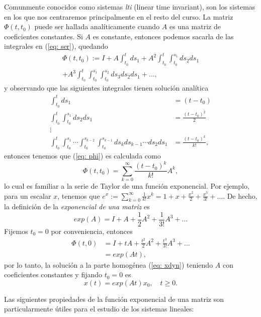 Comunmente conocidos como sistemas \emph{lti} (linear time invariant), son los sistemas en los que nos centraremos principalmente en el resto del curso. La matriz $\Phi(t,t_0)$ puede ser hallada analíticamente cuando $A$ es una matriz de coeficientes constantes. Si $A$ es constante, entonces podemos sacarla de las integrales en (\ref{eq: ser}), quedando
\begin{align}
	\Phi(t,t_0) := I + A \int_{t_0}^t ds_1 + A^2 \int_{t_0}^t \int_{t_0}^{s_1} ds_2ds_1 \nonumber \\ + A^3 \int_{t_0}^t \int_{t_0}^{s_1} \int_{t_0}^{s_2} ds_3ds_2ds_1 + \dots \label{eq: phi},
\end{align}
y observando que las siguientes integrales tienen solución analítica
\begin{align}
	\int_{t_0}^t ds_1 &= (t-t_0) \nonumber \\
	\int_{t_0}^t\int_{t_0}^{s_1} ds_2ds_1 &= \frac{(t-t_0)^2}{2} \nonumber \\
	\vdots \nonumber \\
	\int_{t_0}^t\int_{t_0}^{s_1} \cdots \int_{t_0}^{s_{k-2}}\int_{t_0}^{s_{k-1}}ds_k ds_{k-1} \cdots ds_2ds_1 &= \frac{(t-t_0)^k}{k!}, \nonumber
\end{align}
entonces tenemos que (\ref{eq: phi}) es calculada como
\begin{equation}
	\Phi(t,t_0) = \sum_{k=0}^{\infty} \frac{(t-t_0)^k}{k!}A^k,
\end{equation}
lo cual es familiar a la serie de Taylor de una función exponencial. Por ejemplo, para un escalar $x$, tenemos que $e^x := \sum_{k=0}^{\infty}\frac{1}{k!}x^k = 1 + x + \frac{x^2}{2} + \frac{x^3}{3!} + \dots $. De hecho, la definición de la \emph{exponencial de una matriz} es
\begin{equation}
	exp(A) = I + A + \frac{1}{2} A^2 + \frac{1}{3!} A^3 + \dots
\end{equation}
Fijemos $t_0 = 0$ por conveniencia, entonces
\begin{align}
	\Phi(t,0) &= I + tA + \frac{t^2}{2} A^2 + \frac{t^3}{3!} A^3 + \dots \nonumber \\
	&= exp(At),
\end{align}
por lo tanto, la solución a la parte homogénea (\ref{eq: xdyn}) teniendo $A$ con coeficientes constantes y fijando $t_0 = 0$ es
\begin{equation}
	x(t) = exp(At)x_0,\quad t\geq 0.
	\label{eq: xexp}
\end{equation}

Las siguientes propiedades de la función exponencial de una matriz son particularmente útiles para el estudio de los sistemas lineales:

